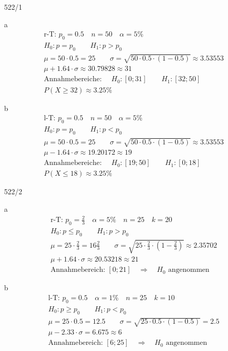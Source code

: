 \begin{exercise}{522/1}
  \item [a]
  \begin{gather*}
    \text{r-T: } p_0 = 0.5 \quad n = 50 \quad \alpha = 5\% \\
    H_0 \colon p = p_0 \qquad H_1 \colon p > p_0 \\
    \mu = 50 \cdot 0.5 = 25 \qquad \sigma = \sqrt{50 \cdot 0.5 \cdot (1 - 0.5)} \approx 3.53553 \\
    \mu + 1.64 \cdot \sigma \approx 30.79828 \approx 31 \\
    \text{Annahmebereiche: } \quad H_0 \colon [0; 31] \qquad H_1 \colon [32; 50] \\
    P(X \geq 32) \approx 3.25\%
  \end{gather*}
  \item [b]
  \begin{gather*}
    \text{l-T: } p_0 = 0.5 \quad n = 50 \quad \alpha = 5\% \\
    H_0 \colon p = p_0 \qquad H_1 \colon p < p_0 \\
    \mu = 50 \cdot 0.5 = 25 \qquad \sigma = \sqrt{50 \cdot 0.5 \cdot (1 - 0.5)} \approx 3.53553 \\
    \mu - 1.64 \cdot \sigma \approx 19.20172 \approx 19 \\
    \text{Annahmebereiche: } \quad H_0 \colon [19; 50] \qquad H_1 \colon [0; 18] \\
    P(X \leq 18) \approx 3.25\%
  \end{gather*}
\end{exercise}
\begin{exercise}{522/2}
  \item [a]
  \begin{gather*}
    \text{r-T: } p_0 = \frac{2}{3} \quad \alpha = 5\% \quad n = 25 \quad k = 20 \\
    H_0 \colon p \leq p_0 \qquad H_1 \colon p > p_0 \\
    \mu = 25 \cdot \frac{2}{3} = 16\frac{2}{3} \qquad \sigma = \sqrt{25 \cdot \frac{2}{3} \cdot (1 - \frac{2}{3})} \approx 2.35702 \\
    \mu + 1.64 \cdot \sigma \approx 20.53218 \approx 21 \\
    \text{Annahmebereich: } [0; 21] \quad\Rightarrow\quad \text{$H_0$ angenommen}
  \end{gather*}
  \item [b]
  \begin{gather*}
    \text{l-T: } p_0 = 0.5 \quad \alpha = 1\% \quad n = 25 \quad k = 10 \\
    H_0 \colon p \geq p_0 \qquad H_1 \colon p < p_0 \\
    \mu = 25 \cdot 0.5 = 12.5 \qquad \sigma = \sqrt{25 \cdot 0.5 \cdot (1 - 0.5)} = 2.5 \\
    \mu - 2.33 \cdot \sigma = 6.675 \approx 6 \\
    \text{Annahmebereich: } [6; 25] \quad\Rightarrow\quad \text{$H_0$ angenommen}
  \end{gather*}
\end{exercise}
